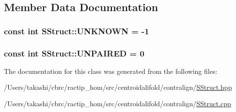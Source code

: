 \subsection{Member Data Documentation}
\hypertarget{class_c_o_n_t_r_a_l_i_g_n_1_1_s_struct_a5158068f84b0eea15da8d3f43572581a}{
\subsubsection[{U\+N\+K\+N\+O\+W\+N}]{\setlength{\rightskip}{0pt plus 5cm}const int S\+Struct\+::\+U\+N\+K\+N\+O\+W\+N = -\/1\hspace{0.3cm}{\ttfamily [static]}}}\label{class_c_o_n_t_r_a_l_i_g_n_1_1_s_struct_a5158068f84b0eea15da8d3f43572581a}
\hypertarget{class_c_o_n_t_r_a_l_i_g_n_1_1_s_struct_a65509ae93cf1bcb551d780653c721a56}{
\subsubsection[{U\+N\+P\+A\+I\+R\+E\+D}]{\setlength{\rightskip}{0pt plus 5cm}const int S\+Struct\+::\+U\+N\+P\+A\+I\+R\+E\+D = 0\hspace{0.3cm}{\ttfamily [static]}}}\label{class_c_o_n_t_r_a_l_i_g_n_1_1_s_struct_a65509ae93cf1bcb551d780653c721a56}


The documentation for this class was generated from the following files\+:\begin{DoxyCompactItemize}
\item 
/\+Users/takashi/cbrc/ractip\+\_\+hom/src/centroidalifold/contralign/\hyperlink{centroidalifold_2contralign_2_s_struct_8hpp}{S\+Struct.\+hpp}\item 
/\+Users/takashi/cbrc/ractip\+\_\+hom/src/centroidalifold/contralign/\hyperlink{centroidalifold_2contralign_2_s_struct_8cpp}{S\+Struct.\+cpp}\end{DoxyCompactItemize}
